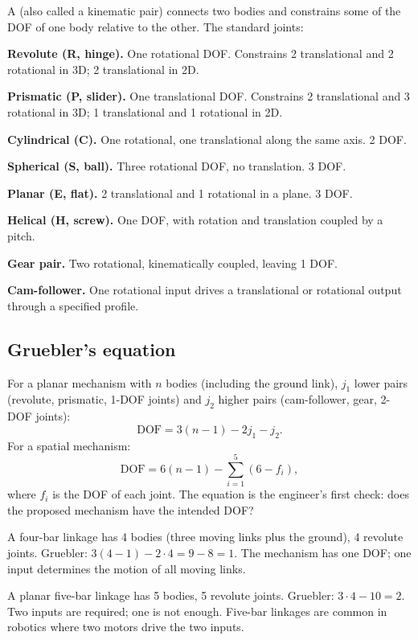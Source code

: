 A  (also called a kinematic pair) connects two bodies and constrains some of the DOF of one body relative to the other. The standard joints:

\textbf{Revolute (R, hinge).} One rotational DOF. Constrains 2 translational and 2 rotational in 3D; 2 translational in 2D.

\textbf{Prismatic (P, slider).} One translational DOF. Constrains 2 translational and 3 rotational in 3D; 1 translational and 1 rotational in 2D.

\textbf{Cylindrical (C).} One rotational, one translational along the same axis. 2 DOF.

\textbf{Spherical (S, ball).} Three rotational DOF, no translation. 3 DOF.

\textbf{Planar (E, flat).} 2 translational and 1 rotational in a plane. 3 DOF.

\textbf{Helical (H, screw).} One DOF, with rotation and translation coupled by a pitch.

\textbf{Gear pair.} Two rotational, kinematically coupled, leaving 1 DOF.

\textbf{Cam-follower.} One rotational input drives a translational or rotational output through a specified profile.

\subsection{Gruebler's equation}

For a planar mechanism with $n$ bodies (including the ground link), $j_1$ lower pairs (revolute, prismatic, 1-DOF joints) and $j_2$ higher pairs (cam-follower, gear, 2-DOF joints):
\[
\text{DOF} = 3(n-1) - 2 j_1 - j_2.
\]
For a spatial mechanism:
\[
\text{DOF} = 6(n-1) - \sum_{i=1}^{5} (6 - f_i),
\]
where $f_i$ is the DOF of each joint. The equation is the engineer's first check: does the proposed mechanism have the intended DOF?

\begin{example}
A four-bar linkage has 4 bodies (three moving links plus the ground), 4 revolute joints. Gruebler: $3(4-1) - 2 \cdot 4 = 9 - 8 = 1$. The mechanism has one DOF; one input determines the motion of all moving links.
\end{example}

\begin{example}
A planar five-bar linkage has 5 bodies, 5 revolute joints. Gruebler: $3 \cdot 4 - 10 = 2$. Two inputs are required; one is not enough. Five-bar linkages are common in robotics where two motors drive the two inputs.
\end{example}

